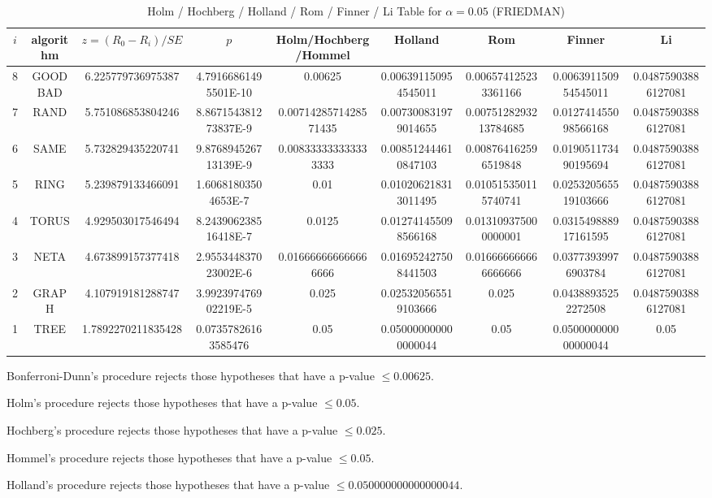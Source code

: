\documentclass[a4paper,10pt]{article}
\begin{document}
\begin{landscape}
\begin{table}[!htp]
\begin{tabular}{
|r|r|r|r|r|r|r|r|r|r|}
\end{tabular}
\end{table}

\newpage

\begin{table}[!htp]
\centering\scriptsize
\caption{Holm / Hochberg / Holland / Rom / Finner / Li Table for $\alpha=0.05$ (FRIEDMAN)}
\begin{tabular}{ccccccccc}
$i$&algorithm&$z=(R_0 - R_i)/SE$&$p$&Holm/Hochberg/Hommel&Holland&Rom&Finner&Li\\
\hline
8& GOODBAD&6.225779736975387&4.79166861495501E-10&0.00625&0.006391150954545011&0.006574125233361166&0.006391150954545011&0.04875903886127081\\
7& RAND&5.751086853804246&8.867154381273837E-9&0.0071428571428571435&0.007300831979014655&0.0075128293213784685&0.012741455098566168&0.04875903886127081\\
6& SAME&5.732829435220741&9.876894526713139E-9&0.008333333333333333&0.008512444610847103&0.008764162596519848&0.019051173490195694&0.04875903886127081\\
5& RING&5.239879133466091&1.60681803504653E-7&0.01&0.010206218313011495&0.010515350115740741&0.025320565519103666&0.04875903886127081\\
4& TORUS&4.929503017546494&8.243906238516418E-7&0.0125&0.012741455098566168&0.013109375000000001&0.031549888917161595&0.04875903886127081\\
3& NETA&4.673899157377418&2.955344837023002E-6&0.016666666666666666&0.016952427508441503&0.016666666666666666&0.03773939976903784&0.04875903886127081\\
2& GRAPH&4.107919181288747&3.992397476902219E-5&0.025&0.025320565519103666&0.025&0.04388935252272508&0.04875903886127081\\
1& TREE&1.7892270211835428&0.07357826163585476&0.05&0.050000000000000044&0.05&0.050000000000000044&0.05\\
\hline
\end{tabular}
\end{table}
Bonferroni-Dunn's procedure rejects those hypotheses that have a p-value $\le0.00625$.


Holm's procedure rejects those hypotheses that have a p-value $\le0.05$.


Hochberg's procedure rejects those hypotheses that have a p-value $\le0.025$.


Hommel's procedure rejects those hypotheses that have a p-value $\le0.05$.


Holland's procedure rejects those hypotheses that have a p-value $\le0.050000000000000044$.



\end{landscape}
\end{document}
